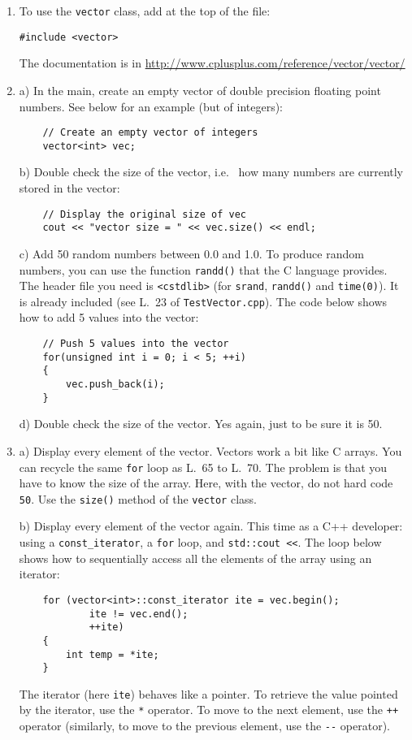 \begin{enumerate}

\item To use the \verb+vector+ class, add at the top of the file:
\begin{lstlisting}
#include <vector>
\end{lstlisting}
The documentation is in \url{http://www.cplusplus.com/reference/vector/vector/}

\item a) In the main, create an empty vector of double precision floating point numbers. See below for an example (but of integers):
\begin{lstlisting}
    // Create an empty vector of integers
    vector<int> vec;
\end{lstlisting}

 b) Double check the size of the vector, i.e.~ how many numbers are currently stored in the vector:
\begin{lstlisting}
    // Display the original size of vec
    cout << "vector size = " << vec.size() << endl;
\end{lstlisting}

c) Add 50 random numbers between 0.0 and 1.0. 
To produce random numbers, you can use the function \verb+randd()+ that the C language provides. The header file you need is \verb+<cstdlib>+ (for \verb+srand+, \verb+randd()+ and \verb+time(0)+). 
It is already included (see L.~23 of \verb+TestVector.cpp+).
The code below shows how to add 5 values into the vector:
\begin{lstlisting}
    // Push 5 values into the vector
    for(unsigned int i = 0; i < 5; ++i)
    {
        vec.push_back(i);
    }
\end{lstlisting}

d) Double check the size of the vector. Yes again, just to be sure it is 50.

\item a) Display every element of the vector. 
Vectors work a bit like C arrays. 
You can recycle the same \verb+for+ loop as L.~65 to L.~70. 
The problem is that you have to know the size of the array. 
Here, with the vector, do not hard code \verb+50+. 
Use the \verb+size()+ method of the \verb+vector+ class. 

b) Display every element of the vector again. 
This time as a C++ developer: 
using a \verb+const_iterator+, a \verb+for+ loop, and \verb+std::cout <<+. 
The loop below shows how to sequentially access all the elements of the array using an iterator:
\begin{lstlisting}
    for (vector<int>::const_iterator ite = vec.begin();
            ite != vec.end();
            ++ite)
    {
        int temp = *ite;
    }
\end{lstlisting}
The iterator (here \verb+ite+) behaves like a pointer. 
To retrieve the value pointed by the iterator, use the \verb+*+ operator. 
To move to the next element, use the \verb!++! operator
(similarly, to move to the previous element, use the \verb!--! operator). 



\end{enumerate}
